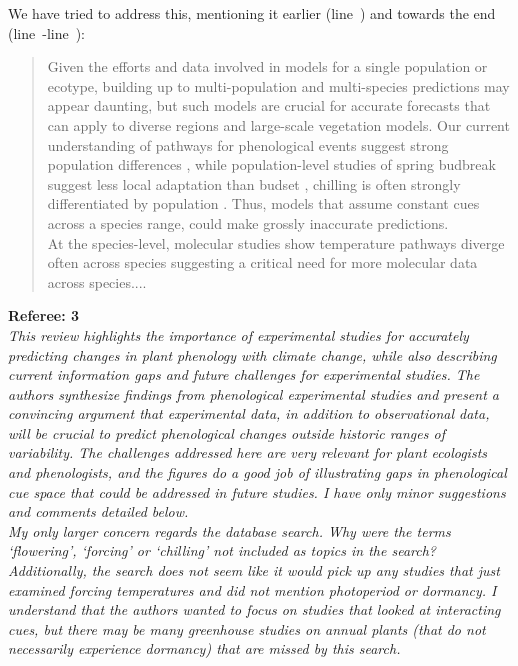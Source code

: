 \documentclass[11pt,letter]{article}
\newcommand{\lr}[1]{line~\lineref{#1}}
\begin{document}
We have tried to address this, mentioning it earlier (\lr{molecpop}) and towards the end (\lr{r2popstart}-\lr{r2popsend}):
\begin{quote}
Given the efforts and data involved in models for a single population or ecotype, building up to multi-population and multi-species predictions may appear daunting, but such models are crucial for accurate forecasts that can apply to diverse regions and large-scale vegetation models. Our current understanding of pathways for phenological events suggest strong population differences \citep{Wilczek:2009oa,Tanino2010}, while population-level studies of spring budbreak suggest less local adaptation than budset \citep{Aitken:2008}, chilling is often strongly differentiated by population \citep{Junttila:2012aa}. Thus, models that assume constant cues across a species range, could make grossly inaccurate predictions. \\

At the species-level, molecular studies show temperature pathways diverge often across species \citep[on contrast, photoperiodic control appears highly conserved,][]{Satake2022} suggesting a critical need for more molecular data across species....
\end{quote}


{\bf Referee: 3}\\

\emph{This review highlights the importance of experimental studies for accurately predicting changes in plant phenology with climate change, while also describing current information gaps and future challenges for experimental studies.  The authors synthesize findings from phenological experimental studies and present a convincing argument that experimental data, in addition to observational data, will be crucial to predict phenological changes outside historic ranges of variability. The challenges addressed here are very relevant for plant ecologists and phenologists, and the figures do a good job of illustrating gaps in phenological cue space that could be addressed in future studies. I have only minor suggestions and comments detailed below. }\\

\emph{My only larger concern regards the database search. Why were the terms `flowering’, `forcing’ or `chilling’ not included as topics in the search? Additionally, the search does not seem like it would pick up any studies that just examined forcing temperatures and did not mention photoperiod or dormancy. I understand that the authors wanted to focus on studies that looked at interacting cues, but there may be many greenhouse studies on annual plants (that do not necessarily experience dormancy) that are missed by this search. }\\
\end{document}
